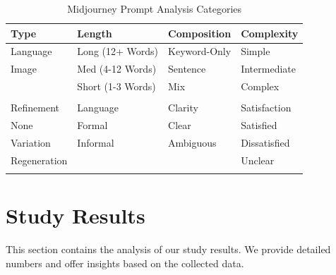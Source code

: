 \begin{table}[]
    \centering
    \caption{Midjourney Prompt Analysis Categories}
    \begin{tabular}{@{}llll@{}}
        \toprule
        Type         & Length            & Composition  & Complexity   \\ \midrule
        Language     & Long (12+ Words)  & Keyword-Only & Simple       \\
        Image        & Med (4-12 Words)  & Sentence     & Intermediate \\
        & Short (1-3 Words) & Mix          & Complex      \\
        \\
        \toprule
        Refinement          & Language & Clarity & Satisfaction \\
        \midrule
        None & Formal & Clear & Satisfied \\
        Variation          & Informal & Ambiguous & Dissatisfied \\
        Regeneration & & & Unclear \\\\
        \bottomrule
    \end{tabular}
    \label{tab:midjourney-prompt-analysis-categories}
\end{table}

\section{Study Results}
\label{sec:study-results}
This section contains the analysis of our study results.
We provide detailed numbers and offer insights based on the collected data.
